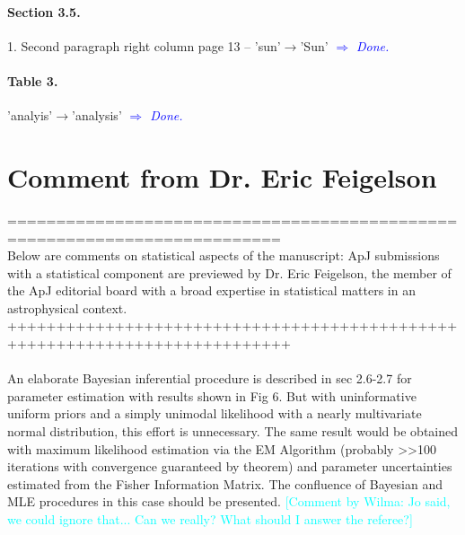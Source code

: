 \documentclass[10pt,a4paper]{article}
\newcommand{\HW}[1]{\textcolor{Cyan}{#1}}
\newcommand{\Comment}[1]{\textsl{\textcolor{Blue}{$\Longrightarrow$ {#1}}}}
\begin{document}
\paragraph{Section 3.5.} 1. Second paragraph right column page 13 -- 'sun'$\rightarrow$'Sun' \Comment{Done.}

\paragraph{Table 3.} 'analyis'$\rightarrow$'analysis'  \Comment{Done.}

\section{Comment from Dr. Eric Feigelson}


==========================================================================\\
Below are comments on statistical aspects of the manuscript: ApJ submissions with a
statistical component are previewed by Dr. Eric Feigelson, the member of the ApJ
editorial board with a broad expertise in statistical matters in an astrophysical
context.\\
+++++++++++++++++++++++++++++++++++++++++++++++++++++++++++++++++++++++++++\\\\

An elaborate Bayesian inferential procedure is described in sec 2.6-2.7 for
parameter estimation with results shown in Fig 6. But with uninformative uniform
priors and a simply unimodal likelihood with a nearly multivariate normal
distribution, this effort is unnecessary. The same result would be obtained with
maximum likelihood estimation via the EM Algorithm (probably >>100 iterations with
convergence guaranteed by theorem) and parameter uncertainties estimated from the
Fisher Information Matrix. The confluence of Bayesian and MLE procedures in this
case should be presented. \HW{[Comment by Wilma: Jo said, we could ignore that... Can we really? What should I answer the referee?]}
\end{document}
